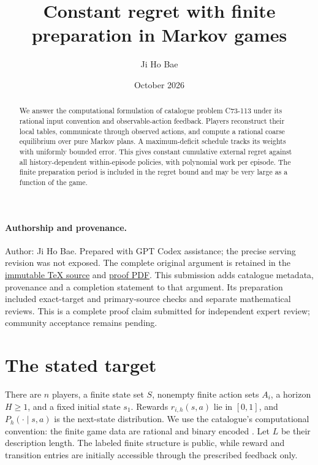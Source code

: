 \documentclass[11pt]{article}
\title{Constant regret with finite preparation in Markov games}
\author{Ji Ho Bae}
\date{October 2026}
\begin{document}
\maketitle

\paragraph{Authorship and provenance.}
Author: Ji Ho Bae. Prepared with GPT Codex assistance; the precise serving
revision was not exposed. The complete original argument is retained in
the \href{https://github.com/jbaelaw/markov-game-constant-regret-proof/blob/bae26db857293585b886da154ab9e4b2fcc16949/paper/Proof.tex}{immutable TeX source} and
\href{https://github.com/jbaelaw/markov-game-constant-regret-proof/blob/bae26db857293585b886da154ab9e4b2fcc16949/paper/Proof.pdf}{proof PDF}. This submission adds catalogue metadata,
provenance and a completion statement to that argument. Its preparation
included exact-target and primary-source checks and separate mathematical
reviews. This is a complete proof claim submitted for independent expert
review; community acceptance remains pending.

\begin{abstract}
We answer the computational formulation of catalogue problem C73-113
under its rational input convention and observable-action feedback.
Players reconstruct their local tables, communicate through observed
actions, and compute a rational coarse equilibrium over pure Markov
plans. A maximum-deficit schedule tracks its weights with uniformly
bounded error. This gives constant cumulative external regret against
all history-dependent within-episode policies, with polynomial work per
episode. The finite preparation period is included in the regret bound
and may be very large as a function of the game.
\end{abstract}

\section{The stated target}
There are $n$ players, a finite state set $S$, nonempty finite action
sets $A_i$, a horizon $H\geq1$, and a fixed initial state $s_1$.
Rewards $r_{i,h}(s,a)$ lie in $[0,1]$, and $P_h(\cdot\mid s,a)$ is the
next-state distribution. We use the catalogue's computational convention:
the finite game data are rational and binary encoded
\cite[Common conventions, Computational representations]{catalogue}.
Let $L$ be their description length. The labeled finite structure is
public, while reward and transition entries are initially accessible
through the prescribed feedback only.
\end{document}
